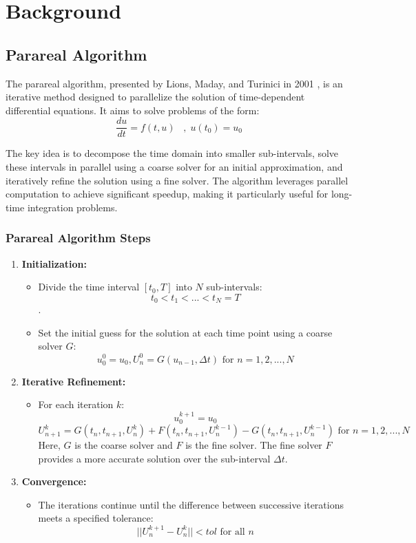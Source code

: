 \documentclass[a4paper,12pt,french]{article}
\begin{document}

\newpage
\section{Background}
\subsection{Parareal Algorithm}
The parareal algorithm, presented by Lions, Maday, and Turinici in 2001 \cite{lions2001resolution}, is an iterative method designed to parallelize the solution of time-dependent differential equations. It aims to solve problems of the form:
$$
\frac{du}{dt} = f(t,u) \;\;\;,\; u(t_0) = u_0
$$

The key idea is to decompose the time domain into smaller sub-intervals, solve these intervals in parallel using a coarse solver for an initial approximation, and iteratively refine the solution using a fine solver. The algorithm leverages parallel computation to achieve significant speedup, making it particularly useful for long-time integration problems.

\subsubsection{Parareal Algorithm Steps}

\begin{enumerate}
    \item \textbf{Initialization:}
    \begin{itemize}
        \item Divide the time interval $[t_0,T]$ into $N$ sub-intervals: $$t_0<t_1<...<t_N=T$$.
        \item Set the initial guess for the solution at each time point using a coarse solver $G$:
            $$u^0_0=u_0,U^0_n=G(u_{n-1},\Delta t) \text{   for  } n=1,2,...,N$$
    \end{itemize}
    \item \textbf{Iterative Refinement:}
    \begin{itemize}
        \item For each iteration $k$:
        $$u^{k+1}_0=u_0$$
        $$ U_{n+1}^k = G(t_n,t_{n+1},U_n^k) + F(t_n,t_{n+1},U_n^{k-1}) -G(t_n,t_{n+1},U_n^{k-1})\text{   for  } n=1,2,...,N$$
        Here, $G$ is the coarse solver and $F$ is the fine solver. The fine solver $F$ provides a more accurate solution over the sub-interval $\Delta t$.
    \end{itemize}
    \item \textbf{Convergence:}
    \begin{itemize}
        \item The iterations continue until the difference between successive iterations meets a specified tolerance:
        $$||U_n^{k+1}-U_n^{k}|| < tol \text{  for all  } n$$
    \end{itemize}
\end{enumerate}
\end{document}
